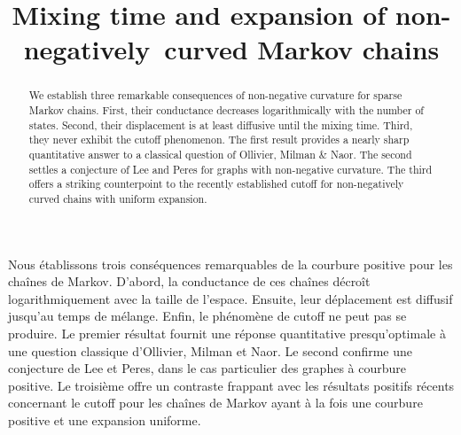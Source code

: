 \documentclass[JEP,XML,SOM,Unicode,NoEqCountersInSection,published]{cedram}
\theoremstyle{definition}
\begin{document}
\frontmatter
\title{Mixing time and expansion of non-negatively~curved Markov chains}

\author[\initial{F.} \lastname{Münch}]{ }
\address{Max-Planck-Institut für Mathematik in den Naturwissenschaften\\
Inselstr. 22, 04103 Leipzig, Germany}

\author[\initial{J.} \lastname{Salez}]{ }
\address{Université Paris-Dauphine \& PSL, CEREMADE\\
Place du Maréchal de Lattre de Tassigny, F-75775 Paris Cedex 16, France}

\begin{abstract}
We establish three remarkable consequences of non-negative curvature for sparse Markov chains. First, their conductance decreases logarithmically with the number of states. Second, their displacement is at least diffusive until the mixing time. Third, they never exhibit the cutoff phenomenon. The first result provides a nearly sharp quantitative answer to a classical question of Ollivier, Milman \& Naor. The second settles a conjecture of Lee and Peres for graphs with non-negative curvature. The third offers a striking counterpoint to the recently established cutoff for non-negatively curved chains with uniform expansion.
\end{abstract}





\begin{altabstract}
Nous établissons trois conséquences remarquables de la courbure positive pour les chaînes de Markov. D'abord, la conductance de ces chaînes décroît logarithmiquement avec la taille de l'espace. Ensuite, leur déplacement est diffusif jusqu'au temps de mélange. Enfin, le phénomène de cutoff ne peut pas se produire. Le premier résultat fournit une réponse quantitative presqu'optimale à une question classique d'Ollivier, Milman et Naor. Le second confirme une conjecture de Lee et Peres, dans le cas particulier des graphes à courbure positive. Le troisième offre un contraste frappant avec les résultats positifs récents concernant le cutoff pour les chaînes de Markov ayant à la fois une courbure positive et une expansion uniforme.
\end{altabstract}
\maketitle
\vspace*{-\baselineskip}
\tableofcontents
\mainmatter
\end{document}

